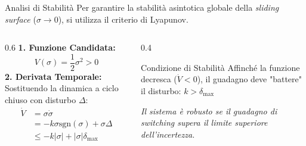 \documentclass[aspectratio=169]{beamer} %
\begin{document}
\begin{frame}{Analisi di Stabilità}
    Per garantire la stabilità asintotica globale della \textit{sliding surface} ($\sigma \to 0$), si utilizza il criterio di Lyapunov.
    \vspace{0.3cm}
    \begin{columns}[T]
        \begin{column}{0.6\textwidth}
            \textbf{1. Funzione Candidata:}
            \begin{equation*}
                V(\sigma) = \frac{1}{2}\sigma^2 > 0
            \end{equation*}
            \textbf{2. Derivata Temporale:}
            Sostituendo la dinamica a ciclo chiuso con disturbo $\Delta$:
            \begin{align*}
                \dot{V} &= \sigma \dot{\sigma} \\
                        &= -k \sigma \text{sgn}(\sigma) + \sigma \Delta \\
                        &\le -k |\sigma| + |\sigma| \delta_{\max}
            \end{align*}
        \end{column}
        \begin{column}{0.4\textwidth}
            \centering
            \vspace{1cm}
            \begin{alertblock}{Condizione di Stabilità}
                Affinché la funzione decresca ($\dot{V} < 0$), il guadagno deve "battere" il disturbo:
                \vspace{0.2cm}
                \centering
                \large
                \boldmath
                $k > \delta_{\max}$
                \unboldmath
            \end{alertblock}
            \small \itshape
            Il sistema è robusto se il guadagno di switching supera il limite superiore dell'incertezza.
        \end{column}
    \end{columns}
\end{frame}
\end{document}
